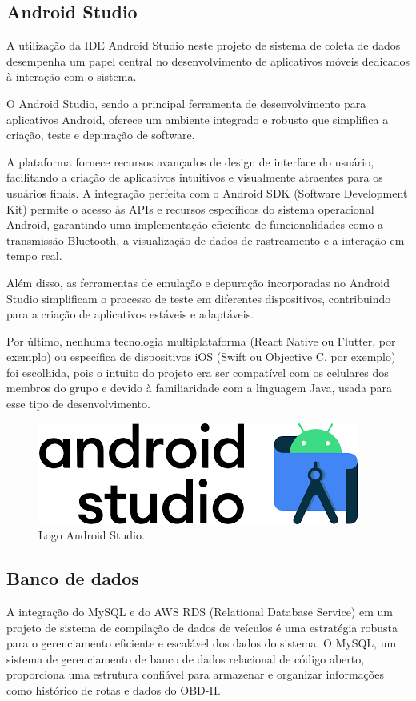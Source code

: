     \subsection{Android Studio} A utilização da IDE Android Studio neste projeto de sistema de coleta de dados desempenha um papel central no desenvolvimento de aplicativos móveis dedicados à interação com o sistema. 
    
    O Android Studio, sendo a principal ferramenta de desenvolvimento para aplicativos Android, oferece um ambiente integrado e robusto que simplifica a criação, teste e depuração de software. 
    
    A plataforma fornece recursos avançados de design de interface do usuário, facilitando a criação de aplicativos intuitivos e visualmente atraentes para os usuários finais. A integração perfeita com o Android SDK (Software Development Kit) permite o acesso às APIs e recursos específicos do sistema operacional Android, garantindo uma implementação eficiente de funcionalidades como a transmissão Bluetooth, a visualização de dados de rastreamento e a interação em tempo real. 
    
    Além disso, as ferramentas de emulação e depuração incorporadas no Android Studio simplificam o processo de teste em diferentes dispositivos, contribuindo para a criação de aplicativos estáveis e adaptáveis.

    Por último, nenhuma tecnologia multiplataforma (React Native ou Flutter, por exemplo) ou específica de dispositivos iOS (Swift ou Objective C, por exemplo) foi escolhida, pois o intuito do projeto era ser compatível com os celulares dos membros do grupo e devido à familiaridade com a linguagem Java, usada para esse tipo de desenvolvimento.

     \begin{figure}[hp]
    \centering
    
    \includegraphics[scale=0.4]{figures/logo_android.png}
    
    \caption{Logo Android Studio.}
    
\end{figure}
    
     \subsection{Banco de dados} A integração do MySQL e do AWS RDS (Relational Database Service) em um projeto de sistema de compilação de dados de veículos é uma estratégia robusta para o gerenciamento eficiente e escalável dos dados do sistema. O MySQL, um sistema de gerenciamento de banco de dados relacional de código aberto, proporciona uma estrutura confiável para armazenar e organizar informações como histórico de rotas e dados do OBD-II. 
     
